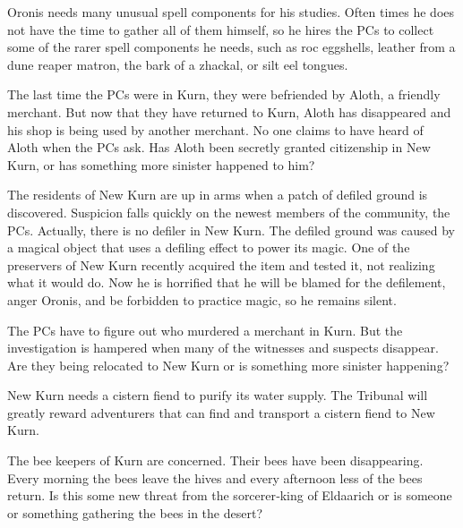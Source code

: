 {
	\item Oronis needs many unusual spell components for his studies. Often times he does not have the time to gather all of them himself, so he hires the PCs to collect some of the rarer spell components he needs, such as roc eggshells, leather from a dune reaper matron, the bark of a zhackal, or silt eel tongues.
	\item The last time the PCs were in Kurn, they were befriended by Aloth, a friendly merchant. But now that they have returned to Kurn, Aloth has disappeared and his shop is being used by another merchant. No one claims to have heard of Aloth when the PCs ask. Has Aloth been secretly granted citizenship in New Kurn, or has something more sinister happened to him?
	\item The residents of New Kurn are up in arms when a patch of defiled ground is discovered. Suspicion falls quickly on the newest members of the community, the PCs. Actually, there is no defiler in New Kurn. The defiled ground was caused by a magical object that uses a defiling effect to power its magic. One of the preservers of New Kurn recently acquired the item and tested it, not realizing what it would do. Now he is horrified that he will be blamed for the defilement, anger Oronis, and be forbidden to practice magic, so he remains silent.
	\item The PCs have to figure out who murdered a merchant in Kurn. But the investigation is hampered when many of the witnesses and suspects disappear. Are they being relocated to New Kurn or is something more sinister happening?
	\item New Kurn needs a cistern fiend to purify its water supply. The Tribunal will greatly reward adventurers that can find and transport a cistern fiend to New Kurn.
	\item The bee keepers of Kurn are concerned. Their bees have been disappearing. Every morning the bees leave the hives and every afternoon less of the bees return. Is this some new threat from the sorcerer‐king of Eldaarich or is someone or something gathering the bees in the desert?
}
